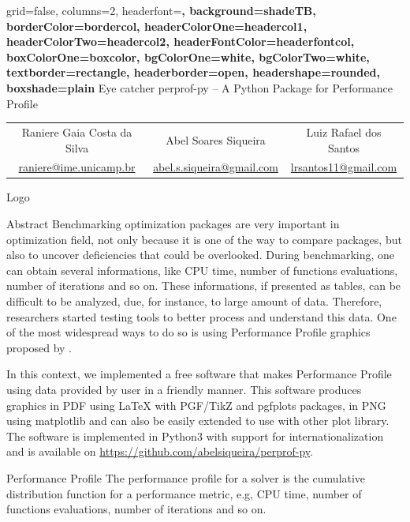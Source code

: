 \documentclass[a0paper,portrait]{baposter}
\begin{document}
\begin{poster}
  {
    grid=false,
    columns=2,
    headerfont=\Large\sf\bf,
    background=shadeTB,
    borderColor=bordercol,
    headerColorOne=headercol1,
    headerColorTwo=headercol2,
    headerFontColor=headerfontcol,
    boxColorOne=boxcolor,
    bgColorOne=white,
    bgColorTwo=white,
    textborder=rectangle,
    headerborder=open,
    headershape=rounded,
    boxshade=plain
  }
  {
    Eye catcher
  }
  {
    perprof-py -- A Python Package for Performance Profile
  }
  {
    \begin{tabular}{ccc}
      Raniere Gaia Costa da Silva &
      Abel Soares Siqueira &
      Luiz Rafael dos Santos \\
      \url{raniere@ime.unicamp.br} &
      \url{abel.s.siqueira@gmail.com} &
      \url{lrsantos11@gmail.com}
    \end{tabular}
  }
  {
    Logo
  }

  \begin{posterbox}[column=0]{Abstract}
    Benchmarking optimization packages are very important in optimization
    field, not only because it is one of the way to compare packages, but also
    to uncover deficiencies that could be overlooked. During benchmarking, one
    can obtain several informations, like CPU time, number of functions
    evaluations, number of iterations and so on. These informations, if
    presented as tables, can be difficult to be analyzed, due, for instance,
    to large amount of data. Therefore, researchers started testing tools to
    better process and understand this data.  One of the most widespread ways
    to do so is using Performance Profile graphics proposed by
    \cite{Dolan2001}.

    In this context, we implemented a free software that makes Performance
    Profile using data provided by user in a friendly manner. This software
    produces graphics in PDF using LaTeX with PGF/TikZ\nocite{TikZ} and
    pgfplots\nocite{pgfplots} packages, in PNG using
    matplotlib\nocite{Hunter:2007} and can also be easily extended to use with
    other plot library. The software is implemented in Python3 with support
    for internationalization and is available on
    \url{https://github.com/abelsiqueira/perprof-py}.
  \end{posterbox}

  \begin{posterbox}[column=0,below=auto]{Performance Profile}
    The performance profile for a solver is the cumulative distribution
    function for a performance metric, e.g, CPU time, number of functions
    evaluations, number of iterations and so on.


\end{posterbox}
\end{poster}
\end{document}
